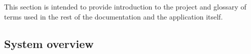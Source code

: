 



% 


This section is intended to provide introduction to the project and glossary of
terms used in the rest of the documentation and the application itself.

\subsection{System overview}




% 


